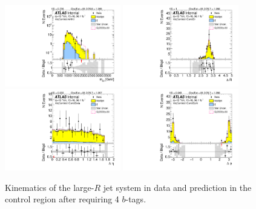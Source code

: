 \begin{figure}[htbp!]
\begin{center}
\includegraphics[angle=270, width=0.45\textwidth]{./figures/boosted/Control/b77_FourTag_Control_mHH_l_1.pdf}
\includegraphics[angle=270, width=0.45\textwidth]{./figures/boosted/Control/b77_FourTag_Control_hCandDr.pdf}\\
\includegraphics[angle=270, width=0.45\textwidth]{./figures/boosted/Control/b77_FourTag_Control_hCandDeta.pdf}
\includegraphics[angle=270, width=0.45\textwidth]{./figures/boosted/Control/b77_FourTag_Control_hCandDphi.pdf}
  \caption{Kinematics of the large-$R$ jet system in data and prediction in the control region after requiring 4 $b$-tags.  }
  \label{fig:boosted-4b-control-ak10-system}
\end{center}
\end{figure}

